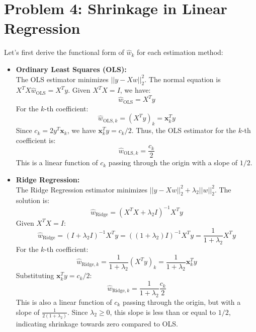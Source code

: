 \documentclass[11pt, a4paper, oneside]{memoir}
\begin{document}
\chapter{Problem 4: Shrinkage in Linear Regression}
Let's first derive the functional form of $\hat{w}_k$ for each estimation method:

\begin{itemize}
    \item \textbf{Ordinary Least Squares (OLS):} \\
      The OLS estimator minimizes $||y - Xw||_2^2$. The normal equation is $X^T X \hat{w}_{\text{OLS}} = X^T y$.
      Given $X^T X = I$, we have:
      \[ \hat{w}_{\text{OLS}} = X^T y \]
      For the $k$-th coefficient\footnotemark :
      \[ \hat{w}_{\text{OLS},k} = (X^T y)_k = \mathbf{x}_k^T y \] 
      Since $c_k = 2 y^T \mathbf{x}_k$, we have $\mathbf{x}_k^T y = c_k / 2$.
      Thus, the OLS estimator for the $k$-th coefficient is:
      \[ \hat{w}_{\text{OLS},k} = \frac{c_k}{2} \]
      This is a linear function of $c_k$ passing through the origin with a slope of $1/2$.

    \item \textbf{Ridge Regression:} \\
      The Ridge Regression estimator minimizes $||y - Xw||_2^2 + \lambda_2 ||w||_2^2$. The solution is:
      \[ \hat{w}_{\text{Ridge}} = (X^T X + \lambda_2 I)^{-1} X^T y \]
      Given $X^T X = I$:
      \[ \hat{w}_{\text{Ridge}} = (I + \lambda_2 I)^{-1} X^T y = ((1 + \lambda_2) I)^{-1} X^T y = \frac{1}{1 + \lambda_2} X^T y \]
      For the $k$-th coefficient:
      \[ \hat{w}_{\text{Ridge},k} = \frac{1}{1 + \lambda_2} (X^T y)_k = \frac{1}{1 + \lambda_2} \mathbf{x}_k^T y \]
      Substituting $\mathbf{x}_k^T y = c_k / 2$:
      \[ \hat{w}_{\text{Ridge},k} = \frac{1}{1 + \lambda_2} \frac{c_k}{2} \]
      This is also a linear function of $c_k$ passing through the origin, but with a slope of $\frac{1}{2(1 + \lambda_2)}$.
      Since $\lambda_2 \ge 0$, this slope is less than or equal to $1/2$, indicating shrinkage towards zero compared to OLS.
    

\end{itemize}
\end{document}
